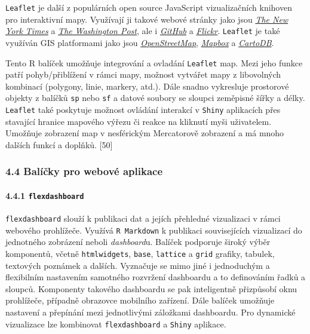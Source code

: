 \documentclass[12pt,]{article}
\let\oldparagraph\paragraph
\renewcommand{\paragraph}[1]{\oldparagraph{#1}\mbox{}}
\begin{document}
\qquad \texttt{Leaflet} je další z populárních open source JavaScript
vizualizačních knihoven pro interaktivní mapy. Využívají ji takové
webové stránky jako jsou
\href{http://www.nytimes.com/projects/elections/2013/nyc-primary/mayor/map.html}{\emph{The
New York Times}} a
\href{http://www.washingtonpost.com/sf/local/2013/11/09/washington-a-world-apart/?utm_term=.906188040dc1}{\emph{The
Washington Post}}, ale i
\href{https://blog.github.com/2013-06-13-there-s-a-map-for-that/}{\emph{GitHub}}
a \href{https://www.flickr.com/map}{\emph{Flickr}}. \texttt{Leaflet} je
také využíván GIS platformami jako jsou
\href{http://www.openstreetmap.org/\#map=7/49.714/15.060}{\emph{OpenStreetMap}},
\href{https://www.mapbox.com/}{\emph{Mapbox}} a
\href{https://carto.com/}{\emph{CartoDB}}.

\qquad Tento R balíček umožňuje integrování a ovladání \texttt{Leaflet}
map. Mezi jeho funkce patří pohyb/přiblížení v rámci mapy, možnost
vytvářet mapy z libovolných kombinací (polygony, linie, markery, atd.).
Dále snadno vykresluje prostorové objekty z balíčků \texttt{sp} nebo
\texttt{sf} a datové soubory se sloupci zeměpisné šířky a délky.
\texttt{Leaflet} také poskytuje možnost ovládání interakcí v
\texttt{Shiny} aplikacích přes stavající hranice mapového výřezu či
reakce na kliknutí myši uživatelem. Umožňuje zobrazení map v nesférickým
Mercatorově zobrazení a má mnoho dalších funkcí a doplňků. {[}50{]}

\newpage

\subsubsection{4.4 Balíčky pro webové
aplikace}\label{balicky-pro-webove-aplikace}

\paragraph{\texorpdfstring{4.4.1
\texttt{flexdashboard}}{4.4.1 flexdashboard}}\label{flexdashboard}

\qquad \texttt{flexdashboard} slouží k publikaci dat a jejích přehledné
vizualizaci v rámci webového prohlížeče. Využívá \texttt{R\ Markdown} k
publikaci souvisejících vizualizací do jednotného zobrázení neboli
\emph{dashboard}u. Balíček podporuje široký výběr komponentů, včetně
\texttt{htmlwidgets}, \texttt{base}, \texttt{lattice} a \texttt{grid}
grafiky, tabulek, textových poznámek a dalších. Vyznačuje se mimo jiné i
jednoduchým a flexibilním nastavením samotného rozvržení dashboardu a to
definováním řadků a sloupců. Komponenty takového dashboardu se pak
inteligentně přizpůsobí oknu prohlížeče, případně obrazovce mobilního
zařízení. Dále balíček umožňuje nastavení a přepínání mezi jednotlivými
záložkami dashboardu. Pro dynamické vizualizace lze kombinovat
\texttt{flexdashboard} a \texttt{Shiny} aplikace.
\end{document}

